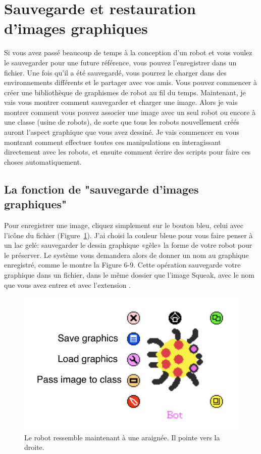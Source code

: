 \documentclass[a4paper,10pt,twoside]{book}
\begin{document}
\section{Sauvegarde et restauration d'images graphiques}

Si vous avez pass\'e beaucoup de temps \`a la conception d'un robot et vous voulez le sauvegarder 
pour une future r\'ef\'erence, vous pouvez l'enregistrer dans un fichier. Une fois qu'il a \'et\'e 
sauvegard\'e, vous pourrez le charger dans des environnements diff\'erents et le partager avec vos 
amis. Vous pouvez commencer \`a cr\'eer une biblioth\`eque de graphismes de robot au fil du temps. 
Maintenant, je vais vous montrer comment sauvegarder et charger une image. Alors je vais montrer 
comment vous pouvez associer une image avec un seul robot ou encore \`a une classe (usine de robots), 
de sorte que tous les robots nouvellement cr\'e\'es auront l'aspect graphique que vous avez dessin\'e. 
Je vais commencer en vous montrant comment effectuer toutes ces manipulations en interagissant 
directement avec les robots, et ensuite comment \'ecrire des scripts pour faire ces choses automatiquement.


\subsection{La fonction de "sauvegarde d'images graphiques"}

Pour enregistrer une image, cliquez simplement sur le bouton bleu, celui avec l'icône du fichier 
(Figure~\ref{fig:PicaHaloSaveAndLoadAnnotated}). J'ai choisi la couleur bleue pour vous faire 
penser \`a un lac gel\'e: sauvegarder le dessin graphique «g\`ele» la forme de votre robot pour le 
pr\'eserver. Le syst\`eme vous demandera alors de donner un nom au graphique enregistr\'e, comme le 
montre la Figure 6-9. Cette op\'eration sauvegarde votre graphique dans un fichier, dans le m\^eme 
dossier que l'image Squeak, avec le nom que vous avez entrez et avec l'extension . 

\begin{figure}[h]
\begin{center}
\includegraphics{picaHaloSaveAndLoadAnnotated}
\end{center}
\caption{Le robot ressemble maintenant \`a une araign\'ee. Il pointe vers la droite.  \label{fig:PicaHaloSaveAndLoadAnnotated}}
\end{figure}
\end{document}
